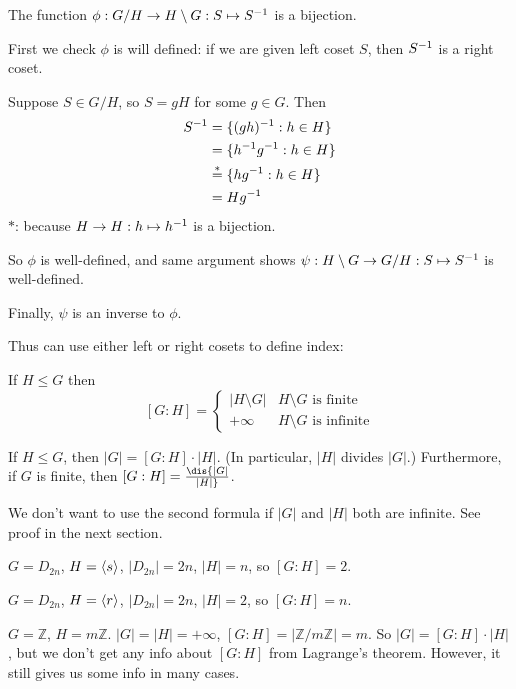 \begin{prop}
The function $\phi:G/H\to H\setminus G:S\mapsto S^{-1}$ is a bijection.
\end{prop}

\begin{pf}
First we check $\phi$ is will defined: if we are given left coset $S$, then $S^{-1}$ is a right coset.

Suppose $S\in G/H$, so $S=gH$ for some $g\in G$. Then
$$\begin{aligned}
S^{-1} &= \{(gh)^{-1}: h\in H\}\\
&= \{h^{-1} g^{-1}:h\in H\}\\
&\stackrel{*}{=} \{hg^{-1}: h\in H\}\\
&= Hg^{-1} 
\end{aligned}$$
$*$: because $H\to H:h\mapsto h^{-1}$ is a bijection.

So $\phi$ is well-defined, and same argument shows $\psi: H\setminus G\to G/H:S\mapsto S^{-1}$ is well-defined.

Finally, $\psi$ is an inverse to $\phi$.
\end{pf}

Thus can use either left or right cosets to define index:
\begin{corr}
If $H\le G$ then
$$
[G:H]=
\begin{cases}
|H\setminus G| & H\setminus G\text{ is finite}\\
+\infty & H\setminus G\text{ is infinite}
\end{cases}
$$
\end{corr}

\begin{thm}
If $H\le G$, then $|G|=[G:H]\cdot |H|$. (In particular, $|H|$ divides $|G|$.) Furthermore, if $G$ is finite, then $[G:H]=\dis{|G|\over |H|}$.
\end{thm}
\begin{remark}
We don't want to use the second formula if $|G|$ and $|H|$ both are infinite. See proof in the next section.
\end{remark}

\begin{ex}
$G=D_{2n}$, $H=\left\langle s \right\rangle$, $|D_{2n}|=2n$, $|H|=n$, so $[G:H]=2$.

$G=D_{2n}$, $H=\left\langle r \right\rangle$, $|D_{2n}|=2n$, $|H|=2$, so $[G:H]=n$.

$G=\mathbb Z$, $H=m\mathbb Z$. $|G|=|H|=+\infty$, $[G:H]=|\mathbb Z/m\mathbb Z|=m$. So $|G|=[G:H]\cdot |H|$, but we don't get any info about $[G:H]$ from Lagrange's theorem. However, it still gives us some info in many cases.
\end{ex}


